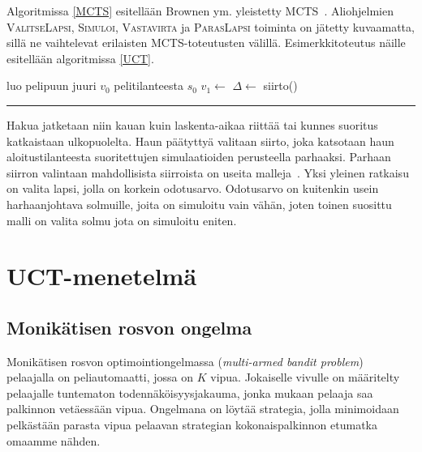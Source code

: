 \documentclass[12pt,finnish]{tktltiki2}
\theoremstyle{definition}
\theoremstyle{remark}
\begin{document}
Algoritmissa \ref{MCTS} esitellään Brownen ym. yleistetty MCTS~\cite{browne}. Aliohjelmien \textsc{ValitseLapsi}, \textsc{Simuloi}, \textsc{Vastavirta} ja \textsc{ParasLapsi} toiminta on jätetty kuvaamatta, sillä ne vaihtelevat erilaisten MCTS-toteutusten välillä. Esimerkkitoteutus näille esitellään algoritmissa \ref{UCT}.

\newpage
\begin{samepage}
\begin{center}
\label{MCTS}
\begin{algorithmic}[0]
	\State luo pelipuun juuri $v_0$ pelitilanteesta $s_0$
		\State $v_1 \leftarrow$ 
		\State $\Delta \leftarrow$ 
		\State {}
	\EndWhile
	\State \Return siirto()
\EndFunction
\end{algorithmic}
\rule{\textwidth}{1pt}
\end{center}
\end{samepage}

Hakua jatketaan niin kauan kuin laskenta-aikaa riittää tai kunnes suoritus katkaistaan ulkopuolelta. Haun päätyttyä valitaan siirto, joka katsotaan haun aloitustilanteesta suoritettujen simulaatioiden perusteella parhaaksi. Parhaan siirron valintaan mahdollisista siirroista on useita malleja~\cite{browne}. Yksi yleinen ratkaisu on valita lapsi, jolla on korkein odotusarvo. Odotusarvo on kuitenkin usein harhaanjohtava solmuille, joita on simuloitu vain vähän, joten toinen suosittu malli on valita solmu jota on simuloitu eniten.

\section{UCT-menetelmä}

\subsection{Monikätisen rosvon ongelma}

Monikätisen rosvon optimointiongelmassa (\textit{multi-armed bandit problem})~\cite{browne} pelaajalla on peliautomaatti, jossa on $K$ vipua. Jokaiselle vivulle on määritelty pelaajalle tuntematon todennäköisyysjakauma, jonka mukaan pelaaja saa palkinnon vetäessään vipua. Ongelmana on löytää strategia, jolla minimoidaan pelkästään parasta vipua pelaavan strategian kokonaispalkinnon etumatka omaamme nähden.
\end{document}
